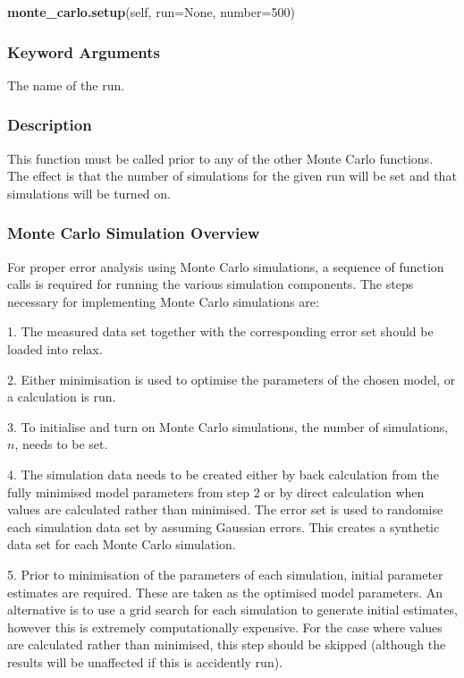 \textsf{\textbf{monte\_carlo.setup}(self, run=None, number=500)}


\subsubsection{Keyword Arguments}

  The name of the run.


\subsubsection{Description}

This function must be called prior to any of the other Monte Carlo functions.  The effect is
that the number of simulations for the given run will be set and that simulations will be
turned on.



\subsubsection{Monte Carlo Simulation Overview}

For proper error analysis using Monte Carlo simulations, a sequence of function calls is
required for running the various simulation components.  The steps necessary for
implementing Monte Carlo simulations are:

1.  The measured data set together with the corresponding error set should be loaded into
relax.

2.  Either minimisation is used to optimise the parameters of the chosen model, or a
calculation is run.

3.  To initialise and turn on Monte Carlo simulations, the number of simulations, $n$, needs
to be set.

4.  The simulation data needs to be created either by back calculation from the fully
minimised model parameters from step 2 or by direct calculation when values are calculated
rather than minimised.  The error set is used to randomise each simulation data set by
assuming Gaussian errors.  This creates a synthetic data set for each Monte Carlo
simulation.

5.  Prior to minimisation of the parameters of each simulation, initial parameter estimates
are required.  These are taken as the optimised model parameters.  An alternative is to use
a grid search for each simulation to generate initial estimates, however this is extremely
computationally expensive.  For the case where values are calculated rather than minimised,
this step should be skipped (although the results will be unaffected if this is accidently
run).

